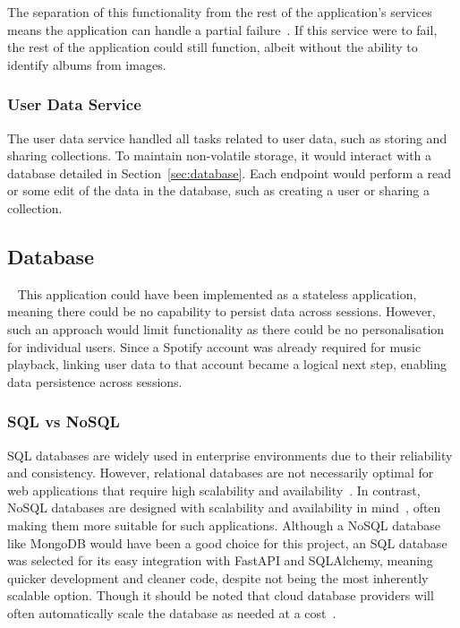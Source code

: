 The separation of this functionality from the rest of the application's services means the application can handle a partial failure~\cite{7333476}. If this service were to fail, the rest of the application could still function, albeit without the ability to identify albums from images.

\subsubsection{User Data Service}
The user data service handled all tasks related to user data, such as storing and sharing collections. To maintain non-volatile storage, it would interact with a database detailed in Section~\ref{sec:database}. Each endpoint would perform a read or some edit of the data in the database, such as creating a user or sharing a collection.

\subsection{Database}~\label{sec:database}
This application could have been implemented as a stateless application, meaning there could be no capability to persist data across sessions. However, such an approach would limit functionality as there could be no personalisation for individual users. Since a Spotify account was already required for music playback, linking user data to that account became a logical next step, enabling data persistence across sessions.

\subsubsection{SQL vs NoSQL}
SQL databases are widely used in enterprise environments due to their reliability and consistency. However, relational databases are not necessarily optimal for web applications that require high scalability and availability~\cite{GANESHCHANDRA201513}. In contrast, NoSQL databases are designed with scalability and availability in mind~\cite{NoSQL}, often making them more suitable for such applications.
Although a NoSQL database like MongoDB would have been a good choice for this project, an SQL database was selected for its easy integration with FastAPI and SQLAlchemy, meaning quicker development and cleaner code, despite not being the most inherently scalable option. Though it should be noted that cloud database providers will often automatically scale the database as needed at a cost~\cite{CloudSQLScaling}.

